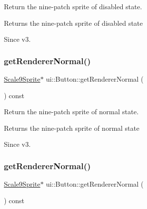 Return the nine-\/patch sprite of disabled state. 

\begin{DoxyReturn}{Returns}
the nine-\/patch sprite of disabled state 
\end{DoxyReturn}
\begin{DoxySince}{Since}
v3. 
\end{DoxySince}
\mbox{\label{classui_1_1Button_afcdcb5e3100669ad291c27cf2ae57e19}} 
\subsubsection{\texorpdfstring{get\+Renderer\+Normal()}{getRendererNormal()}\hspace{0.1cm}{\footnotesize\ttfamily [1/2]}}
{\footnotesize\ttfamily \hyperlink{classui_1_1Scale9Sprite}{Scale9\+Sprite}$\ast$ ui\+::\+Button\+::get\+Renderer\+Normal (\begin{DoxyParamCaption}{ }\end{DoxyParamCaption}) const\hspace{0.3cm}{\ttfamily [inline]}}



Return the nine-\/patch sprite of normal state. 

\begin{DoxyReturn}{Returns}
the nine-\/patch sprite of normal state 
\end{DoxyReturn}
\begin{DoxySince}{Since}
v3. 
\end{DoxySince}
\mbox{\label{classui_1_1Button_afcdcb5e3100669ad291c27cf2ae57e19}} 
\subsubsection{\texorpdfstring{get\+Renderer\+Normal()}{getRendererNormal()}\hspace{0.1cm}{\footnotesize\ttfamily [2/2]}}
{\footnotesize\ttfamily \hyperlink{classui_1_1Scale9Sprite}{Scale9\+Sprite}$\ast$ ui\+::\+Button\+::get\+Renderer\+Normal (\begin{DoxyParamCaption}{ }\end{DoxyParamCaption}) const\hspace{0.3cm}{\ttfamily [inline]}}



